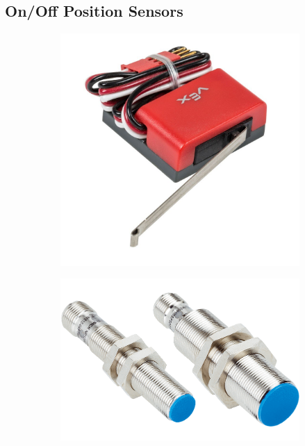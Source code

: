 \subsection{On/Off Position Sensors}
\begin{figure}[H]
\begin{subfigure}[b]{.31\linewidth}
\includegraphics[width=.8\textwidth]{imgs/sensor_limitswitch.jpeg}
\end{subfigure}\begin{subfigure}[b]{.31\linewidth}
\includegraphics[width=.8\textwidth]{imgs/sensor_indprox.png}
\end{subfigure}\begin{subfigure}[b]{.31\linewidth}

\end{subfigure}
\end{figure}
